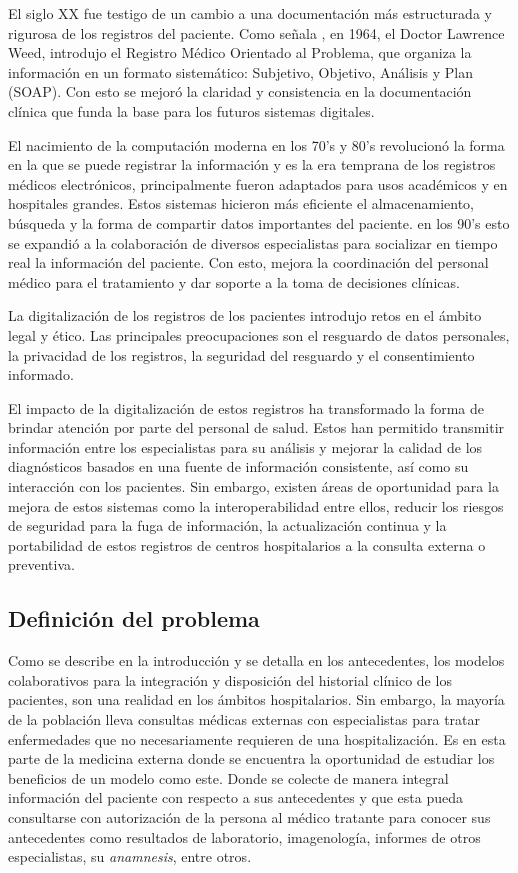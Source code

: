     El siglo XX fue testigo de un cambio a una documentación más estructurada y rigurosa de los registros del paciente. Como señala \cite{jaroudi_remembering_2019}, en 1964, el Doctor Lawrence Weed, introdujo el Registro Médico Orientado al Problema, que organiza la información en un formato sistemático: Subjetivo, Objetivo, Análisis y Plan (SOAP). Con esto se mejoró la claridad y consistencia en la documentación clínica que funda la base para los futuros sistemas digitales.

    El nacimiento de la computación moderna en los 70's y 80's revolucionó la forma en la que se puede registrar la información y es la era temprana de los registros médicos electrónicos, principalmente fueron adaptados para usos académicos y en hospitales grandes. Estos sistemas hicieron más eficiente el almacenamiento, búsqueda y la forma de compartir datos importantes del paciente. en los 90's esto se expandió a la colaboración de diversos especialistas para socializar en tiempo real la información del paciente. Con esto, mejora la coordinación del personal médico para el tratamiento y dar soporte a la toma de decisiones clínicas.

    La digitalización de los registros de los pacientes introdujo retos en el ámbito legal y ético. Las principales preocupaciones son el resguardo de datos personales, la privacidad de los registros, la seguridad del resguardo y el consentimiento informado.

    El impacto de la digitalización de estos registros ha transformado la forma de brindar atención por parte del personal de salud. Estos han permitido transmitir información entre los especialistas para su análisis y mejorar la calidad de los diagnósticos basados en una fuente de información consistente, así como su interacción con los pacientes. Sin embargo, existen áreas de oportunidad para la mejora de estos sistemas como la interoperabilidad entre ellos, reducir los riesgos de seguridad para la fuga de información, la actualización continua y la portabilidad de estos registros de centros hospitalarios a la consulta externa o preventiva.
    \subsection{Definición del problema}
    Como se describe en la introducción y se detalla en los antecedentes, los modelos colaborativos para la integración y disposición del historial clínico de los pacientes, son una realidad en los ámbitos hospitalarios. Sin embargo, la mayoría de la población lleva consultas médicas externas con especialistas para tratar enfermedades que no necesariamente requieren de una hospitalización. Es en esta parte de la medicina externa donde se encuentra la oportunidad de estudiar los beneficios de un modelo como este. Donde se colecte de manera integral información del paciente con respecto a sus antecedentes y que esta pueda consultarse con autorización de la persona al médico tratante para conocer sus antecedentes como resultados de laboratorio, imagenología, informes de otros especialistas, su \emph{anamnesis}, entre otros.

